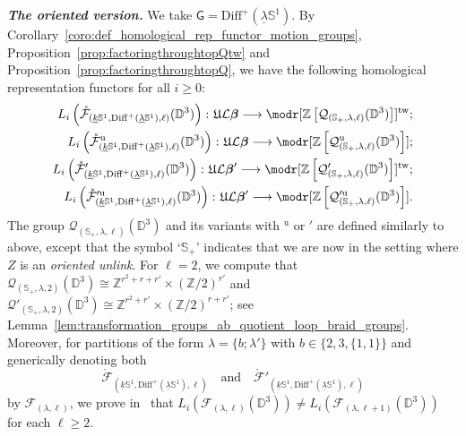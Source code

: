 \documentclass[AHL,Unicode,published]{cedram}
\newcommand{\Diff}{\mathrm{Diff}}
\newcommand{\Int}{\mathring}
\newcommand{\tw}{\mathrm{tw}}
\newcommand{\unt}{\mathrm{u}}
\newcommand{\fU}{\ensuremath{\mathfrak{U}}}
\newcommand{\sG}{\mathsf{G}}
\newcommand{\cF}{\mathcal{F}}
\newcommand{\cL}{\mathcal{L}}
\newcommand{\cQ}{\mathcal{Q}}
\newcommand{\bD}{\mathbb{D}}
\newcommand{\bS}{\mathbb{S}}
\newcommand{\bZ}{\mathbb{Z}}
\newcommand{\too}{\ensuremath{\longrightarrow}}
\newcommand{\Beta}{\boldsymbol{\beta}}
\renewcommand{\geq}{\geqslant}
\begin{document}
\textbf{\emph{The oriented version.}} We take $\sG=\Diff^{+}(\underline{\lambda}\bS^{1})$. By Corollary~\ref{coro:def_homological_rep_functor_motion_groups}, Proposition~\ref{prop:factoringthroughtopQtw} and Proposition~\ref{prop:factoringthroughtopQ}, we have the following homological representation functors for all $i\geq 0$:
\begin{equation}\label{eq:output_of_general_construction_loop_braids_unlinks}
\begin{split}
L_{i}\left(\Int{\cF}_{\left(\underline{k}\bS^{1},\Diff^{+}(\underline{\lambda}\bS^{1}),\ell\right)}(\bD^{3})\right)\colon\fU\cL\Beta \too \modr[\bZ\left[\cQ_{\left(\bS_{+},\lambda,\ell\right)}(\bD^{3})\right]]^{\tw};\\
L_{i}\left(\Int{\cF}^{\unt}_{\left(\underline{k}\bS^{1},\Diff^{+}\left(\underline{\lambda}\bS^{1}\right),\ell\right)}(\bD^{3})\right)\colon\fU\cL\Beta \too \modr[\bZ\left[\cQ^{\unt}_{\left(\bS_{+},\lambda,\ell\right)}(\bD^{3})\right]];\\
L_{i}\left(\Int{\cF}'_{\left(\underline{k}\bS^{1},\Diff^{+}\left(\underline{\lambda}\bS^{1}\right),\ell\right)}(\bD^{3})\right)\colon\fU\cL\Beta' \too \modr[\bZ\left[\cQ'_{\left(\bS_{+},\lambda,\ell\right)}(\bD^{3})\right]]^{\tw};\\
L_{i}\left(\Int{\cF}'^{\unt}_{\left(\underline{k}\bS^{1},\Diff^{+}\left(\underline{\lambda}\bS^{1}\right),\ell\right)}(\bD^{3})\right)\colon\fU\cL\Beta' \too \modr[\bZ\left[\cQ'^{\unt}_{\left(\bS_{+},\lambda,\ell\right)}(\bD^{3})\right]].
\end{split}
\end{equation}
The group $\cQ_{(\bS_{+},\lambda,\ell)}(\bD^{3})$ and its variants with ${}^{\unt}$ or $'$ are defined similarly to above, except that the symbol `$\bS_{+}$' indicates that we are now in the setting where $Z$ is an \emph{oriented unlink}. For $\ell = 2$, we compute that $\cQ_{(\bS_{+},\lambda,2)}(\bD^{3})\cong \bZ^{r^2+r+r'}\times (\bZ/2)^{r'}$ and $\cQ'_{(\bS_{+},\lambda,2)}(\bD^{3})\cong \bZ^{r^2+r'}\times (\bZ/2)^{r+r'}$; see Lemma~\ref{lem:transformation_groups_ab_quotient_loop_braid_groups}. Moreover, for partitions of the form $\lambda =\boldsymbol{\{}b;\lambda'\boldsymbol{\}}$ with $b\in\{2,3,\boldsymbol{\{}1,1\boldsymbol{\}}\}$ and generically denoting both
\[
\Int{\cF}_{\left(\underline{k}\bS^{1},\Diff^{+}(\underline{\lambda}\bS^{1}),\ell\right)}\quad \text{and}\quad\Int{\cF}'_{\left(\underline{k}\bS^{1},\Diff^{+}(\underline{\lambda}\bS^{1}),\ell\right)}
\]
by $\cF_{(\lambda,\ell)}$, we prove in~\cite[Prop.~6.2]{PSIN} that $L_{i}(\cF_{(\lambda,\ell)}(\bD^{3}))\neq L_{i}(\cF_{(\lambda,\ell + 1)}(\bD^{3}))$ for each $\ell \geq 2$.
\end{document}
